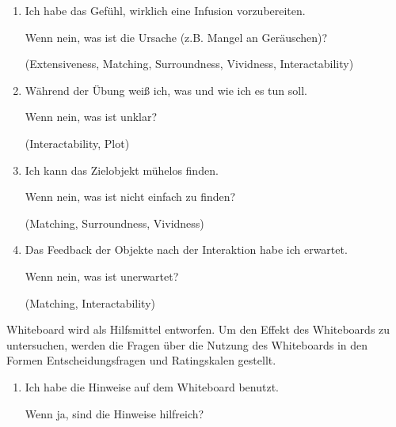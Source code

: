 \begin{enumerate}
    \item Ich habe das Gefühl, wirklich eine Infusion vorzubereiten.
    
    Wenn nein, was ist die Ursache (z.B. Mangel an Geräuschen)?
    
    (Extensiveness, Matching, Surroundness, Vividness, Interactability)
    
    \item Während der Übung weiß ich, was und wie ich es tun soll.
    
    Wenn nein, was ist unklar?
    
    (Interactability, Plot)
    
    \item Ich kann das Zielobjekt mühelos finden.
    
    Wenn nein, was ist nicht einfach zu finden?
    
    (Matching, Surroundness, Vividness)
    
%    
%    
    
    \item  Das Feedback der Objekte nach der Interaktion habe ich erwartet. 
    
    Wenn nein, was ist unerwartet?
    
    (Matching, Interactability)
    
%    
%    
    
\end{enumerate}

Whiteboard wird als Hilfsmittel entworfen. Um den Effekt des Whiteboards zu untersuchen, werden die Fragen über die Nutzung des Whiteboards in den Formen Entscheidungsfragen und Ratingskalen gestellt.

\begin{enumerate}
    \item Ich habe die Hinweise auf dem Whiteboard benutzt.
    
    Wenn ja, sind die Hinweise hilfreich?
\end{enumerate}

